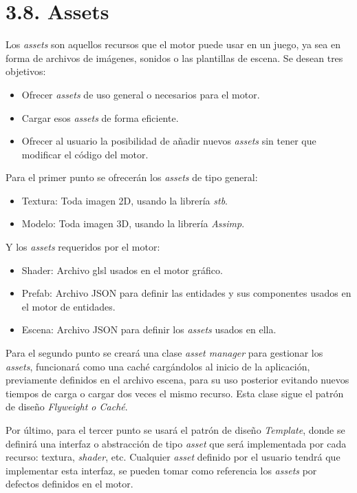 \section*{3.8. Assets}\label{sec:assets}

Los \textit{assets} son aquellos recursos que el motor puede usar en un juego, ya sea en forma de archivos de imágenes, sonidos o las plantillas de escena.
Se desean tres objetivos:
\begin{itemize}
    \item Ofrecer \textit{assets} de uso general o necesarios para el motor.
    \item Cargar esos \textit{assets} de forma eficiente.
    \item Ofrecer al usuario la posibilidad de añadir nuevos \textit{assets} sin tener que modificar el código del motor.
\end{itemize}
Para el primer punto se ofrecerán los \textit{assets} de tipo general:
\begin{itemize}
    \item Textura: Toda imagen 2D, usando la librería \textit{stb}\cite{stb}.
    \item Modelo: Toda imagen 3D, usando la librería \textit{Assimp}\cite{assimp}.
\end{itemize}
Y los \textit{assets} requeridos por el motor:
\begin{itemize}
    \item Shader: Archivo \gls{glsl} usados en el motor gráfico.
    \item Prefab: Archivo JSON para definir las entidades y sus componentes usados en el motor de entidades.
    \item Escena: Archivo JSON para definir los \textit{assets} usados en ella.
\end{itemize}
Para el segundo punto se creará una clase \textit{asset manager} para gestionar los \textit{assets}, funcionará
como una caché cargándolos al inicio de la aplicación, previamente definidos en el archivo escena, para su uso posterior evitando nuevos tiempos de carga
o cargar dos veces el mismo recurso. Esta clase sigue el patrón de diseño \textit{Flyweight o Caché}\cite{flyweight-pattern}.

Por último, para el tercer punto se usará el patrón de diseño \textit{Template}\cite{template-pattern}, donde se definirá una interfaz o abstracción de tipo \textit{asset}
que será implementada por cada recurso: textura, \textit{shader}, etc. Cualquier \textit{asset} definido por el usuario tendrá que implementar esta interfaz, se pueden tomar como referencia los \textit{assets} por defectos definidos en el motor.


